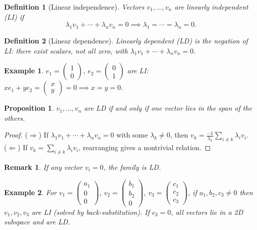 \documentclass{article}
\newtheorem{definition}{Definition}
\newtheorem*{example}{Example}
\newtheorem{remark}{Remark}
\newtheorem{proposition}{Proposition}
\begin{document}
\begin{definition}[Linear independence]
    Vectors $v_1,\ldots,v_n$ are linearly independent (LI) if
    \[\lambda_1v_1+\cdots+\lambda_nv_n = 0 \implies \lambda_1 = \cdots = \lambda_n = 0.\]
\end{definition}
\begin{definition}[Linear dependence]
    Linearly dependent (LD) is the negation of LI: there exist scalars, not all zero, with $\lambda_1v_1+\cdots+\lambda_nv_n=0$.
\end{definition}
\begin{example}
    $e_1=\begin{pmatrix}1\\0\end{pmatrix}$, $e_2=\begin{pmatrix}0\\1\end{pmatrix}$ are LI: $xe_1+ye_2 = \begin{pmatrix}x\\y\end{pmatrix}=0 \implies x=y=0$.
\end{example}
\begin{proposition}
    $v_1,\ldots,v_n$ are LD if and only if one vector lies in the span of the others.
\end{proposition}
\begin{proof}
    ($\Rightarrow$) If $\lambda_1v_1+\cdots+\lambda_nv_n=0$ with some $\lambda_k\neq0$, then $v_k = \frac{-1}{\lambda_k}\sum_{i\neq k}\lambda_iv_i$.\\
    ($\Leftarrow$) If $v_k = \sum_{i\neq k}\lambda_iv_i$, rearranging gives a nontrivial relation.
\end{proof}
\begin{remark}
    If any vector $v_i = 0$, the family is LD.
\end{remark}
\begin{example}
    For $v_1=\begin{pmatrix}a_1\\0\\0\end{pmatrix}$, $v_2=\begin{pmatrix}b_1\\b_2\\0\end{pmatrix}$, $v_3=\begin{pmatrix}c_1\\c_2\\c_3\end{pmatrix}$, if $a_1,b_2,c_3\neq0$ then $v_1,v_2,v_3$ are LI (solved by back-substitution). If $c_3=0$, all vectors lie in a 2D subspace and are LD.
\end{example}
\end{document}
